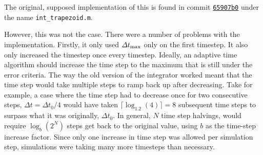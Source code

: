 The original, supposed implementation of this is found in commit \href{https://github.com/TarletonGroup/EasyDD/blob/780a6c41b35687b443d3241674af7393d2140639/int_trapezoid.m}{\texttt{65907b0}} under the name \texttt{int\_trapezoid.m}.

However, this was not the case. There were a number of problems with the implementation. Firstly, it only used $\Delta t_{\textrm{max}}$ only on the first timestep. It also only increased the timestep once every timestep. Ideally, an adaptive time algorithm should increase the time step to the maximum that is still under the error criteria. The way the old version of the integrator worked meant that the time step would take multiple steps to ramp back up after decreasing. Take for example, a case where the time step had to decrease once for two consecutive steps, $\Delta t = \Delta t_0/4$ would have taken $\lceil\log_1.2(4)\rceil = 8$ subsequent time steps to surpass what it was originally, $\Delta t_0$. In general, $N$ time step halvings, would require $\log_b(2^N)$ steps get back to the original value, using $b$ as the time-step increase factor. Since only one increase in time step was allowed per simulation step, simulations were taking many more timesteps than necessary.

